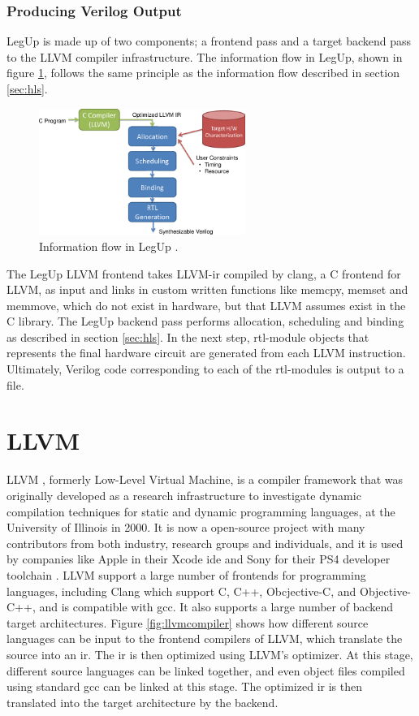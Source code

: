 \subsubsection{Producing Verilog Output}
LegUp is made up of two components; a frontend pass and a target backend pass to the LLVM compiler infrastructure. 
The information flow in LegUp, shown in figure \ref{fig:legupflow}, follows the same principle as the information flow described in section \ref{sec:hls}.
\begin{figure}[hbpt]
\centering
\includegraphics[width=0.6\textwidth]{../figs/LegUpFlow.png}
\caption{\label{fig:legupflow}Information flow in LegUp \cite{legupmaual}.}
\end{figure}
The LegUp LLVM frontend takes LLVM-\gls{ir} compiled by clang, a C frontend for LLVM, as input and links in custom written functions like memcpy, memset and memmove, which do not exist in hardware, but that LLVM assumes exist in the C library. 
The LegUp backend pass performs allocation, scheduling and binding as described in section \ref{sec:hls}. In the next step, \gls{rtl}-module objects that represents the final hardware circuit are generated from each LLVM instruction. Ultimately, Verilog code corresponding to each of the \gls{rtl}-modules is output to a file.

\section{\label{sec:LLVM}LLVM}
LLVM \cite{LLVM:CGO04}, formerly Low-Level Virtual Machine, is a compiler framework that was originally developed as a research infrastructure to investigate dynamic compilation techniques for static and dynamic programming languages, at the University of Illinois in 2000. It is now a open-source project with many contributors from both industry, research groups and individuals, and it is used by companies like Apple in their Xcode \gls{ide} \cite{llvmapple} and Sony for their PS4 developer toolchain \cite{llvmsony}. LLVM support a large number of frontends for programming languages, including Clang \cite{clang} which support C, C++, Obcjective-C, and Objective-C++, and is compatible with \gls{gcc}. It also supports a large number of backend target architectures. Figure \ref{fig:llvmcompiler} shows how different source languages can be input to the frontend compilers of LLVM, which translate the source into an \gls{ir}. The \gls{ir} is then optimized using LLVM's optimizer. At this stage, different source languages can be linked together, and even object files compiled using standard \gls{gcc} can be linked at this stage. The optimized \gls{ir} is then translated into the target architecture by the backend.

